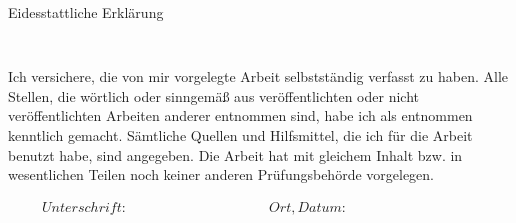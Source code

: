 \thispagestyle{empty}

\begin{verbatim}

\end{verbatim}

\begin{center}
\LARGE{Eidesstattliche Erklärung}
\end{center}
\begin{verbatim}


\end{verbatim}
Ich versichere, die von mir vorgelegte Arbeit selbstständig verfasst zu haben. Alle Stellen, die wörtlich oder sinngemäß aus veröffentlichten oder nicht veröffentlichten Arbeiten anderer entnommen sind, habe  ich als entnommen kenntlich gemacht. Sämtliche Quellen und Hilfsmittel, die ich für die Arbeit benutzt habe, sind angegeben. Die Arbeit hat mit gleichem Inhalt bzw. in wesentlichen Teilen noch keiner anderen Prüfungsbehörde vorgelegen.





\begin{displaymath}
\begin{array}{ll}
Unterschrift:~~~~~~~~~~~~~~~~~~~~~~~~~~~~~~~~~~~~~~~~~~
& Ort, Datum:~~~~~~~~~~~~~~~~~~~~~~~~~~~~~~~~~~~~~~~~~~
\end{array}
\end{displaymath}